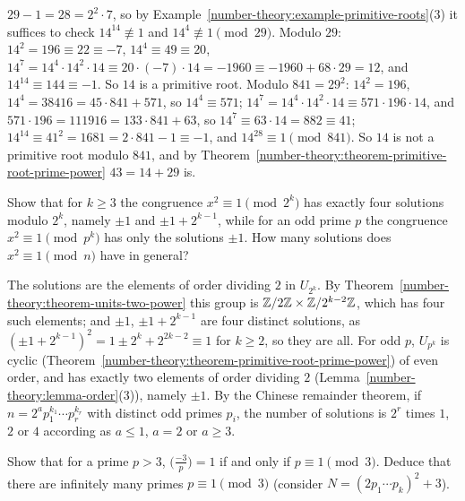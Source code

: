 \begin{solution}
$29 - 1 = 28 = 2^2 \cdot 7$, so by Example~\ref{number-theory:example-primitive-roots}(3) it suffices to check $14^{14} \not\equiv 1$ and $14^4 \not\equiv 1 \pmod{29}$. Modulo $29$: $14^2 = 196 \equiv 22 \equiv -7$,
$14^4 \equiv 49 \equiv 20$, $14^7 = 14^4 \cdot 14^2 \cdot 14 \equiv 20 \cdot (-7) \cdot 14 = -1960 \equiv -1960 + 68 \cdot 29 = 12$, and $14^{14} \equiv 144 \equiv -1$. So $14$ is a primitive root. Modulo
$841 = 29^2$: $14^2 = 196$, $14^4 = 38416 = 45 \cdot 841 + 571$, so $14^4 \equiv 571$; $14^7 = 14^4 \cdot 14^2 \cdot 14 \equiv 571 \cdot 196 \cdot 14$, and $571 \cdot 196 = 111916 = 133 \cdot 841 + 63$, so
$14^7 \equiv 63 \cdot 14 = 882 \equiv 41$; $14^{14} \equiv 41^2 = 1681 = 2 \cdot 841 - 1 \equiv -1$, and $14^{28} \equiv 1 \pmod{841}$. So $14$ is not a primitive root modulo $841$, and by
Theorem~\ref{number-theory:theorem-primitive-root-prime-power} $43 = 14 + 29$ is.
\end{solution}

\begin{exercise}\label{number-theory:exercise-square-roots-one}
Show that for $k \geq 3$ the congruence $x^2 \equiv 1 \pmod{2^k}$ has exactly four solutions modulo $2^k$, namely $\pm1$ and $\pm1 + 2^{k-1}$, while for an odd prime $p$ the congruence
$x^2 \equiv 1 \pmod{p^k}$ has only the solutions $\pm1$. How many solutions does $x^2 \equiv 1 \pmod n$ have in general?
\end{exercise}

\begin{solution}
The solutions are the elements of order dividing $2$ in $U_{2^k}$. By Theorem~\ref{number-theory:theorem-units-two-power} this group is $\mathbb{Z}/2\mathbb{Z} \times \mathbb{Z}/2^{k-2}\mathbb{Z}$, which has four such elements; and
$\pm1$, $\pm1 + 2^{k-1}$ are four distinct solutions, as $(\pm1 + 2^{k-1})^2 = 1 \pm 2^k + 2^{2k-2} \equiv 1$ for $k \geq 2$, so they are all. For odd $p$, $U_{p^k}$ is cyclic
(Theorem~\ref{number-theory:theorem-primitive-root-prime-power}) of even order, and has exactly two elements of order dividing $2$ (Lemma~\ref{number-theory:lemma-order}(3)), namely $\pm1$. By the Chinese
remainder theorem, if $n = 2^ap_1^{k_1} \cdots p_r^{k_r}$ with distinct odd primes $p_i$, the number of solutions is $2^r$ times $1$, $2$ or $4$ according as $a \leq 1$, $a = 2$ or $a \geq 3$.
\end{solution}

\begin{exercise}\label{number-theory:exercise-minus-three}
Show that for a prime $p > 3$, $\bigl(\frac{-3}{p}\bigr) = 1$ if and only if $p \equiv 1 \pmod 3$. Deduce that there are infinitely many primes $p \equiv 1 \pmod 3$ (consider
$N = (2p_1 \cdots p_k)^2 + 3$).
\end{exercise}

